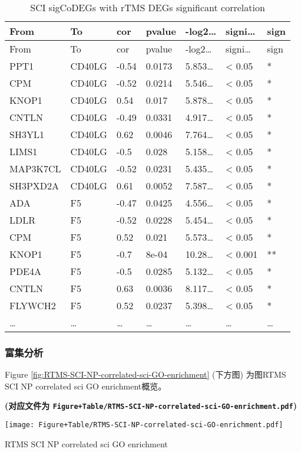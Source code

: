 \documentclass[
]{article}
\begin{document}
\begin{longtable}[]{@{}lllllll@{}}
\caption{\label{tab:SCI-sigCoDEGs-with-rTMS-DEGs-significant-correlation}SCI sigCoDEGs with rTMS DEGs significant correlation}\tabularnewline
\toprule
From & To & cor & pvalue & -log2\ldots{} & signi\ldots{} & sign\tabularnewline
\midrule
\endfirsthead
\toprule
From & To & cor & pvalue & -log2\ldots{} & signi\ldots{} & sign\tabularnewline
\midrule
\endhead
PPT1 & CD40LG & -0.54 & 0.0173 & 5.853\ldots{} & \textless{} 0.05 & *\tabularnewline
CPM & CD40LG & -0.52 & 0.0214 & 5.546\ldots{} & \textless{} 0.05 & *\tabularnewline
KNOP1 & CD40LG & 0.54 & 0.017 & 5.878\ldots{} & \textless{} 0.05 & *\tabularnewline
CNTLN & CD40LG & -0.49 & 0.0331 & 4.917\ldots{} & \textless{} 0.05 & *\tabularnewline
SH3YL1 & CD40LG & 0.62 & 0.0046 & 7.764\ldots{} & \textless{} 0.05 & *\tabularnewline
LIMS1 & CD40LG & -0.5 & 0.028 & 5.158\ldots{} & \textless{} 0.05 & *\tabularnewline
MAP3K7CL & CD40LG & -0.52 & 0.0231 & 5.435\ldots{} & \textless{} 0.05 & *\tabularnewline
SH3PXD2A & CD40LG & 0.61 & 0.0052 & 7.587\ldots{} & \textless{} 0.05 & *\tabularnewline
ADA & F5 & -0.47 & 0.0425 & 4.556\ldots{} & \textless{} 0.05 & *\tabularnewline
LDLR & F5 & -0.52 & 0.0228 & 5.454\ldots{} & \textless{} 0.05 & *\tabularnewline
CPM & F5 & 0.52 & 0.021 & 5.573\ldots{} & \textless{} 0.05 & *\tabularnewline
KNOP1 & F5 & -0.7 & 8e-04 & 10.28\ldots{} & \textless{} 0.001 & **\tabularnewline
PDE4A & F5 & -0.5 & 0.0285 & 5.132\ldots{} & \textless{} 0.05 & *\tabularnewline
CNTLN & F5 & 0.63 & 0.0036 & 8.117\ldots{} & \textless{} 0.05 & *\tabularnewline
FLYWCH2 & F5 & 0.52 & 0.0237 & 5.398\ldots{} & \textless{} 0.05 & *\tabularnewline
\ldots{} & \ldots{} & \ldots{} & \ldots{} & \ldots{} & \ldots{} & \ldots{}\tabularnewline
\bottomrule
\end{longtable}

\hypertarget{ux5bccux96c6ux5206ux6790}{%
\subsubsection{富集分析}\label{ux5bccux96c6ux5206ux6790}}

Figure \ref{fig:RTMS-SCI-NP-correlated-sci-GO-enrichment} (下方图) 为图RTMS SCI NP correlated sci GO enrichment概览。

\textbf{(对应文件为 \texttt{Figure+Table/RTMS-SCI-NP-correlated-sci-GO-enrichment.pdf})}

\def\@captype{figure}
\begin{center}
\texttt{[image: Figure+Table/RTMS-SCI-NP-correlated-sci-GO-enrichment.pdf]}
\caption{RTMS SCI NP correlated sci GO enrichment}\label{fig:RTMS-SCI-NP-correlated-sci-GO-enrichment}
\end{center}
\end{document}
